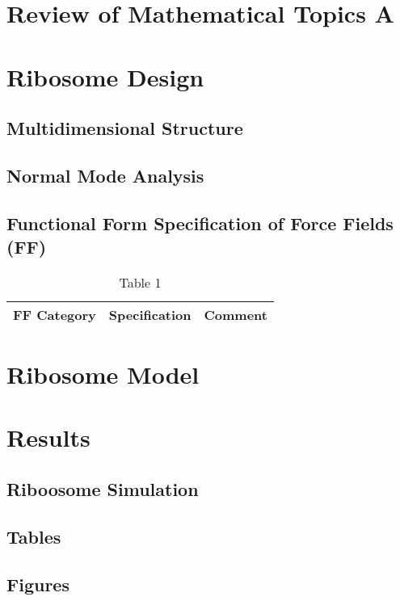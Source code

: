 \section{Review of Mathematical Topics A}


\section{Ribosome Design}

\subsection{Multidimensional Structure}

\subsection{Normal Mode Analysis}

\subsection{Functional Form Specification of Force Fields (FF)}

\begin{table}[H]
\caption{Table 1}
\tiny
\begin{tabular}{p{1cm}p{5cm}p{2cm}}
\hline
FF Category  & Specification & Comment  \\
\hline
\hline
\end{tabular}
\end{table}

\section{Ribosome Model}


\section{Results}

\subsection{Riboosome Simulation}


\subsection{Tables}

\subsection{Figures}

